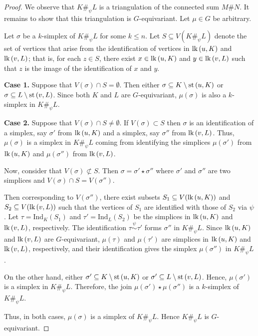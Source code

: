 \documentclass[11pt]{amsart}
\numberwithin{equation}{section}
\theoremstyle{definition}
\newcommand{\st}{\mbox{\upshape st}\,}
\newcommand{\lk}{\mbox{\upshape lk}\,}
\begin{document}
\begin{proof}
We observe that $K\#_{\psi}L$ is a triangulation of the connected sum $M\#N$. 
It remains to show that this triangulation is $G$-equivariant. 
Let $\mu\in G$ be arbitrary.

Let $\sigma$ be a $k$-simplex of $K\#_{\psi}L$ for some $k\leq n$. 
Let $S\subseteq V(K\#_{\psi}L)$ denote the set of vertices that arise from the identification of vertices in $\lk(u,K)$ and $\lk(v,L)$; that is, for each $z\in S$, there exist $x\in \lk(u,K)$ and $y\in \lk(v,L)$ such that $z$ is the image of the identification of $x$ and $y$.

\noindent
\textbf{Case 1.} Suppose that $V(\sigma)\cap S=\emptyset$.  
Then either $\sigma\subseteq K\setminus \st(u,K)$ or $\sigma\subseteq L\setminus \st(v,L)$.  
Since both $K$ and $L$ are $G$-equivariant, $\mu(\sigma)$ is also a $k$-simplex in $K\#_{\psi}L$.

\noindent
\textbf{Case 2.} Suppose that $V(\sigma)\cap S\neq \emptyset$. If $V(\sigma)\subset S$ then $\sigma$ is an identification of a simplex, say $\sigma'$ from $\lk(u,K)$ and a simplex, say $\sigma''$ from $\lk(v,L)$. Thus, $\mu(\sigma)$ is a simplex in $K\#_{\psi}L$ coming from identifying the simplices $\mu(\sigma')$ from $\lk(u,K)$ and $\mu(\sigma'')$ from $\lk(v,L)$. 

Now, consider that $V(\sigma)\not\subset S$. 
Then $\sigma=\sigma'\star\sigma''$ where $\sigma'$ and $\sigma''$ are two simplices and  $V(\sigma)\cap S=V(\sigma'')$.

Then corresponding to $V(\sigma'')$, there exist subsets 
$S_1\subseteq V(\lk(u,K))$ and $S_2\subseteq V(\lk(v,L))$ such that the vertices of $S_1$ are identified with those of $S_2$ via $\psi$.   
Let $\tau=\mathrm{Ind}_K(S_1)$ and $\tau'=\mathrm{Ind}_L(S_2)$ be the simplices in $\lk(u,K)$ and $\lk(v,L)$, respectively.  
The identification $\tau \mathrel{\overset{\scriptscriptstyle \psi}{\sim}} \tau'$ forms $\sigma''$ in $K\#_{\psi}L$.
Since $\lk(u,K)$ and $\lk(v,L)$ are $G$-equivariant, 
$\mu(\tau)$ and $\mu(\tau')$ are simplices in $\lk(u,K)$ and $\lk(v,L)$, respectively, and their identification gives the simplex 
$\mu(\sigma'')$ in $K\#_{\psi}L$.

On the other hand, either $\sigma' \subseteq K\setminus \st(u,K)$ 
or $\sigma'\subseteq L\setminus \st(v,L)$.  
Hence, $\mu(\sigma')$ is a simplex in $K\#_{\psi}L$.  
Therefore, the join 
$\mu(\sigma') \star \mu(\sigma'')$ 
is a $k$-simplex of $K\#_{\psi}L$.

Thus, in both cases, $\mu(\sigma)$ is a simplex of $K\#_{\psi}L$.  
Hence $K\#_{\psi}L$ is $G$-equivariant.
 \end{proof} 
 
\end{document}
